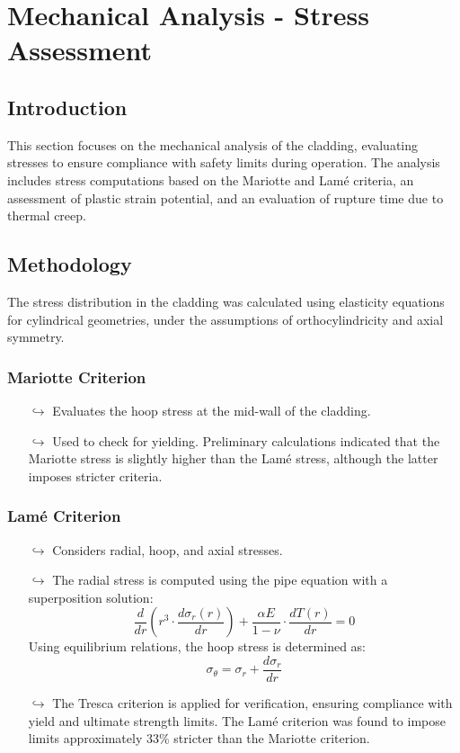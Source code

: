 \section{Mechanical Analysis - Stress Assessment}

\subsection{Introduction}
This section focuses on the mechanical analysis of the cladding, evaluating stresses to ensure compliance with safety limits during operation. The analysis includes stress computations based on the Mariotte and Lamé criteria, an assessment of plastic strain potential, and an evaluation of rupture time due to thermal creep.

\subsection{Methodology}
The stress distribution in the cladding was calculated using elasticity equations for cylindrical geometries, under the assumptions of orthocylindricity and axial symmetry.

\subsubsection{Mariotte Criterion}
\begin{itemize}
    \item[$\hookrightarrow$] Evaluates the hoop stress at the mid-wall of the cladding.
    \item[$\hookrightarrow$] Used to check for yielding. Preliminary calculations indicated that the Mariotte stress is slightly higher than the Lamé stress, although the latter imposes stricter criteria.
\end{itemize}

\subsubsection{Lamé Criterion}
\begin{itemize}
    \item[$\hookrightarrow$] Considers radial, hoop, and axial stresses.
    \item[$\hookrightarrow$] The radial stress is computed using the pipe equation with a superposition solution:
    \begin{equation}
        \frac{d}{dr} \left( r^3 \cdot \frac{d\sigma_r(r)}{dr} \right) + \frac{\alpha E}{1 - \nu} \cdot \frac{dT(r)}{dr} = 0
    \end{equation}
    Using equilibrium relations, the hoop stress is determined as:
    \[
    \sigma_\theta = \sigma_r + \frac{d\sigma_r}{dr}
    \]
    \item[$\hookrightarrow$] The Tresca criterion is applied for verification, ensuring compliance with yield and ultimate strength limits. The Lamé criterion was found to impose limits approximately 33\% stricter than the Mariotte criterion.
\end{itemize}

